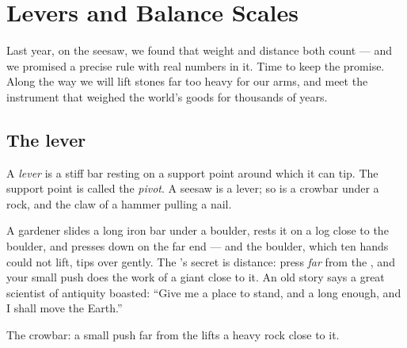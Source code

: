 \chapter{Levers and Balance Scales}\label{ch:g3:levers-and-scales}

Last year, on the seesaw, we found that weight and distance both
count --- and we promised a precise rule with real numbers in it.
Time to keep the promise. Along the way we will lift stones far too
heavy for our arms, and meet the instrument that weighed the world's
goods for thousands of years.

\section{The lever}

\begin{definition}\label{def:g3:levers-and-scales:lever}
A \emph{lever} is a stiff bar resting on a support
point around which it can tip. The support point is called the
\emph{pivot}. A seesaw is a lever; so is a crowbar
under a rock, and the claw of a hammer pulling a nail.
\end{definition}

\begin{example}\label{ex:g3:levers-and-scales:crowbar}
A gardener slides a long iron bar under a boulder, rests it on a log
close to the boulder, and presses down on the far end --- and the
boulder, which ten hands could not lift, tips over gently. The
's secret is distance: press \emph{far} from the , and
your small push does the work of a giant close to it. An old story
says a great scientist of antiquity boasted: ``Give me a place to
stand, and a  long enough, and I shall move the Earth.''
\end{example}

\begin{omfigure}

{\small The crowbar: a small push far from the  lifts a heavy
rock close to it.}
\end{omfigure}

